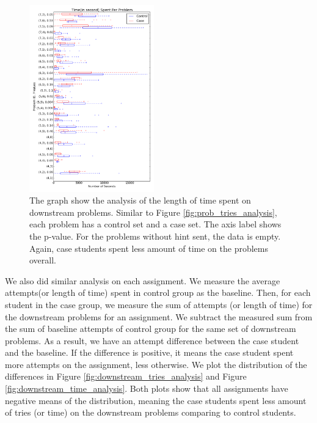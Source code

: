 \documentclass{sigchi}
\begin{document}
\begin{figure}[ht]
  \centering
\includegraphics[width=0.48\textwidth]{image/problem_time_downstream.png}
  \caption{The graph show the analysis of the length of time spent on downstream problems. Similar to Figure \ref{fig:prob_tries_analysis}, each problem has a control set and a case set. The axis label shows the p-value. For the problems without hint sent, the data is empty. Again, case students spent less amount of time on the problems overall.}
   \label{fig:prob_time_analysis}
\end{figure}


We also did similar analysis on each assignment. We measure the average attempts(or length of time) spent in control group as the baseline. Then, for each student in the case group, we measure the sum of attempts (or length of time) for the downstream problems for an assignment. We subtract the measured sum from the sum of baseline attempts of control group for the same set of downstream problems. As a result, we have an attempt difference between the case student and the baseline. If the difference is positive, it means the case student spent more attempts on the assignment, less otherwise. We plot the distribution of the differences in Figure \ref{fig:downstream_tries_analysis} and Figure \ref{fig:downstream_time_analysis}. Both plots show that all assignments have negative means of the distribution, meaning the case students spent less amount of tries (or time) on the downstream problems comparing to control students.
\end{document}
